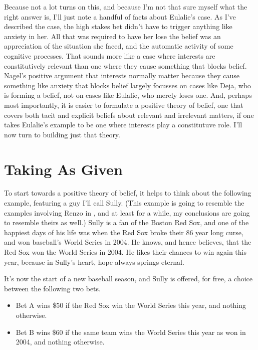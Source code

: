\documentclass[11pt,]{book}
\providecommand{\tightlist}{%
  \setlength{\itemsep}{0pt}\setlength{\parskip}{0pt}}
\begin{document}
Because not a lot turns on this, and because I'm not that sure myself what the right answer is, I'll just note a handful of facts about Eulalie's case. As I've described the case, the high stakes bet didn't have to trigger anything like anxiety in her. All that was required to have her lose the belief was an appreciation of the situation she faced, and the automatic activity of some cognitive processes. That sounds more like a case where interests are constitutively relevant than one where they cause something that blocks belief. Nagel's positive argument that interests normally matter because they cause something like anxiety that blocks belief largely focusses on cases like Deja, who is forming a belief, not on cases like Eulalie, who merely loses one. And, perhaps most importantly, it is easier to formulate a positive theory of belief, one that covers both tacit and explicit beliefs about relevant and irrelevant matters, if one takes Eulalie's example to be one where interests play a constitutuve role. I'll now turn to building just that theory.

\hypertarget{given}{%
\section{Taking As Given}\label{given}}

To start towards a positive theory of belief, it helps to think about the following example, featuring a guy I'll call Sully. (This example is going to resemble the examples involving Renzo in \citet{RossSchroeder2014}, and at least for a while, my conclusions are going to resemble theirs as well.) Sully is a fan of the Boston Red Sox, and one of the happiest days of his life was when the Red Sox broke their 86 year long curse, and won baseball's World Series in 2004. He knows, and hence believes, that the Red Sox won the World Series in 2004. He likes their chances to win again this year, because in Sully's heart, hope always springs eternal.

It's now the start of a new baseball season, and Sully is offered, for free, a choice between the following two bets.

\begin{itemize}
\tightlist
\item
  Bet A wins \$50 if the Red Sox win the World Series this year, and nothing otherwise.
\item
  Bet B wins \$60 if the same team wins the World Series this year as won in 2004, and nothing otherwise.
\end{itemize}
\end{document}
